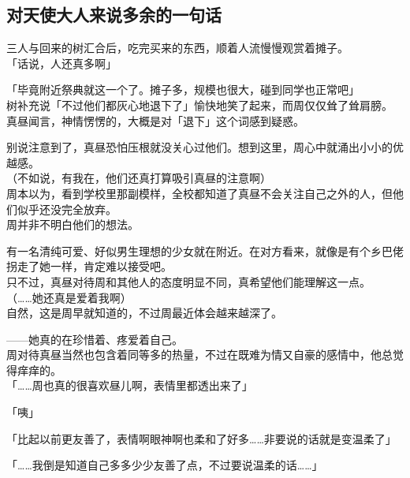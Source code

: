 \subsection{对天使大人来说多余的一句话}

三人与回来的树汇合后，吃完买来的东西，顺着人流慢慢观赏着摊子。\\

「话说，人还真多啊」

「毕竟附近祭典就这一个了。摊子多，规模也很大，碰到同学也正常吧」\\

树补充说「不过他们都灰心地退下了」愉快地笑了起来，而周仅仅耸了耸肩膀。\\

真昼闻言，神情愣愣的，大概是对「退下」这个词感到疑惑。

别说注意到了，真昼恐怕压根就没关心过他们。想到这里，周心中就涌出小小的优越感。\\

（不如说，有我在，他们还真打算吸引真昼的注意啊）\\

周本以为，看到学校里那副模样，全校都知道了真昼不会关注自己之外的人，但他们似乎还没完全放弃。\\

周并非不明白他们的想法。

有一名清纯可爱、好似男生理想的少女就在附近。在对方看来，就像是有个乡巴佬拐走了她一样，肯定难以接受吧。\\

只不过，真昼对待周和其他人的态度明显不同，真希望他们能理解这一点。\\

（……她还真是爱着我啊）\\

自然，这是周早就知道的，不过周最近体会越来越深了。

——她真的在珍惜着、疼爱着自己。\\

周对待真昼当然也包含着同等多的热量，不过在既难为情又自豪的感情中，他总觉得痒痒的。\\

「……周也真的很喜欢昼儿啊，表情里都透出来了」

「咦」

「比起以前更友善了，表情啊眼神啊也柔和了好多……非要说的话就是变温柔了」

「……我倒是知道自己多多少少友善了点，不过要说温柔的话……」\\

